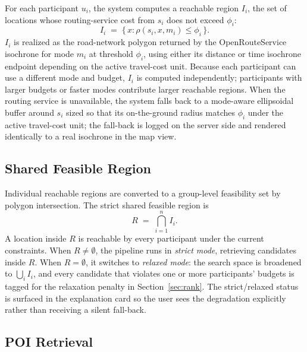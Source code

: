 \documentclass[sigconf]{acmart}
\begin{document}
For each participant $u_i$, the system computes a reachable region $I_i$, the set of locations whose routing-service cost from $s_i$ does not exceed $\phi_i$:
\begin{equation}
  I_i \;=\; \{\, x : \rho(s_i, x, m_i) \leq \phi_i \,\}.
  \label{eq:isochrone}
\end{equation}
$I_i$ is realized as the road-network polygon returned by the OpenRouteService isochrone for mode $m_i$ at threshold $\phi_i$, using either its distance or time isochrone endpoint depending on the active travel-cost unit. Because each participant can use a different mode and budget, $I_i$ is computed independently; participants with larger budgets or faster modes contribute larger reachable regions. When the routing service is unavailable, the system falls back to a mode-aware ellipsoidal buffer around $s_i$ sized so that its on-the-ground radius matches $\phi_i$ under the active travel-cost unit; the fall-back is logged on the server side and rendered identically to a real isochrone in the map view.

\subsection{Shared Feasible Region}
\label{sec:region}

Individual reachable regions are converted to a group-level feasibility set by polygon intersection. The strict shared feasible region is
\begin{equation}
  R \;=\; \bigcap_{i=1}^{n} I_i .
  \label{eq:intersection}
\end{equation}
A location inside $R$ is reachable by every participant under the current constraints. When $R \neq \emptyset$, the pipeline runs in \emph{strict mode}, retrieving candidates inside $R$. When $R = \emptyset$, it switches to \emph{relaxed mode}: the search space is broadened to $\bigcup_i I_i$, and every candidate that violates one or more participants' budgets is tagged for the relaxation penalty in Section~\ref{sec:rank}. The strict/relaxed status is surfaced in the explanation card so the user sees the degradation explicitly rather than receiving a silent fall-back.

\subsection{POI Retrieval}
\label{sec:poi}
\end{document}
